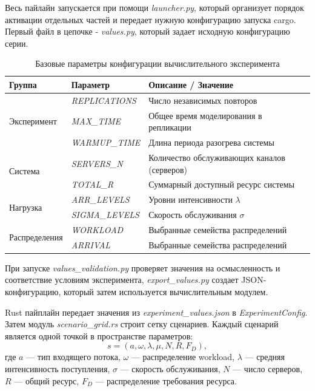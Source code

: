 Весь пайлайн запускается при помощи \textit{launcher.py}, который организует порядок активации отдельных частей и передает нужную конфигурацию запуска cargo. Первый файл в цепочке - \textit{values.py}, который задает исходную конфигурацию серии. 

\begin{table}[h!]
\centering
\caption{Базовые параметры конфигурации вычислительного эксперимента}
\label{tab:program_params}
\begin{tabularx}{\textwidth}{|l|l|X|}
\hline
\textbf{Группа} & \textbf{Параметр} & \textbf{Описание / Значение} \\ \hline
\multirow{3}{*}{Эксперимент} & \textit{REPLICATIONS} & Число независимых повторов  \\ \cline{2-3} 
 & \textit{MAX\_TIME} & Общее время моделирования в репликации \\ \cline{2-3} 
 & \textit{WARMUP\_TIME} & Длина периода разогрева системы \\ \hline
\multirow{2}{*}{Система} & \textit{SERVERS\_N} & Количество обслуживающих каналов (серверов) \\ \cline{2-3} 
 & \textit{TOTAL\_R} & Суммарный доступный ресурс системы \\ \hline
\multirow{2}{*}{Нагрузка} & \textit{ARR\_LEVELS} & Уровни интенсивности $\lambda$ \\ \cline{2-3} 
 & \textit{SIGMA\_LEVELS} & Скорость обслуживания $\sigma$ \\ \hline
\multirow{2}{*}{Распределения} & \textit{WORKLOAD} & Выбранные семейства распределений \\ \cline{2-3} 
 & \textit{ARRIVAL} & Выбранные семейства распределений \\ \hline
\end{tabularx}
\end{table}

При запуске \textit{values\_validation.py} проверяет значения на осмысленность и соответствие условиям эксперимента, \textit{export\_values.py} создает JSON-конфигурацию, который затем используется вычислительным модулем.

Rust пайплайн передает значения из \textit{experiment\_values.json} в \textit{ExperimentConfig}. Затем модуль \textit{scenario\_grid.rs} строит сетку сценариев. Каждый сценарий является одной точкой в пространстве параметров:
$$
s = (a,\omega,\lambda,\mu,N,R,F_D),
$$
где $a$ --- тип входящего потока, $\omega$ --- распределение workload, $\lambda$ --- средняя интенсивность поступления, $\sigma$ --- скорость обслуживания, $N$ --- число серверов, $R$ --- общий ресурс, $F_D$ --- распределение требования ресурса.


